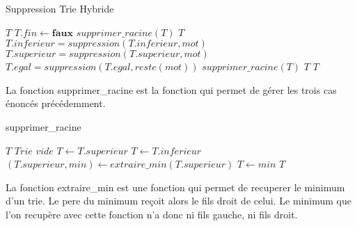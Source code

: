 \documentclass[11pt]{report} %
\begin{document}
\begin{algorithm}
  \caption{Suppression Trie Hybride}
  \begin{algorithmic}[1]
     $T$
    \EndIf
    \State $T.fin \gets \textbf{faux}$  
     $supprimer\_racine(T)$
    \Else
     $T$
    \EndIf
    \State $T.inferieur=suppression(T.inferieur,mot)$
    \State $T.superieur=suppression(T.superieur,mot)$
    \Else
    \State $T.egal=suppression(T.egal,reste(mot))$
     $supprimer\_racine(T)$
    \Else
     $T$
    \EndIf
    \EndIf
     $T$
    \EndFunction
  \end{algorithmic}
\end{algorithm}

La fonction supprimer\_racine est la fonction qui permet de gérer les trois cas énoncés précédemment.

\begin{algorithm}
  \caption{supprimer\_racine}
  \begin{algorithmic}[1]
     $T$
     $Trie$ $vide$
    \State $T \gets T.superieur$ 
    \State $T \gets T.inferieur$ 
    \Else {}
    \State $(T.superieur,min) \gets extraire\_min(T.superieur)$
    \State $T \gets min$
    \EndIf
     $T$
    \EndFunction
  \end{algorithmic}
\end{algorithm}

La fonction extraire\_min est une fonction qui permet de recuperer le minimum d'un trie. Le pere du minimum reçoit alors le fils droit de celui. Le minimum que l'on recupère avec cette fonction n'a donc ni fils gauche, ni fils droit.
\end{document}
